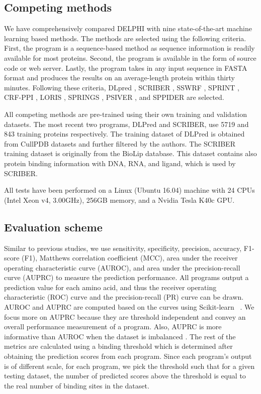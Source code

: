 \documentclass{bioinfo}
\begin{document}
\subsection{Competing methods}
We have comprehensively compared DELPHI with nine state-of-the-art machine learning based methods. The methods are selected using the following criteria. First, the program is a sequence-based method as sequence information is readily available for most proteins. Second, the program is available in the form of source code or web server. Lastly, the program takes in any input sequence in FASTA format and produces the results on an average-length protein within thirty minutes. Following these criteria, DLpred \citep{zhang2019sequence}, SCRIBER \citep{zhang2019scriber}, SSWRF \citep{wei2016protein}, SPRINT \citep{taherzadeh2016sequence}, CRF-PPI \citep{wei2015cascade}, LORIS \citep{dhole2014sequence}, SPRINGS \citep{singh2014springs}, PSIVER \citep{murakami2010applying}, and SPPIDER \citep{porollo2007prediction} are selected.

All competing methods are pre-trained using their own training and validation datasets. The most recent two programs, DLPred and SCRIBER, use 5719 and 843 training proteins respectively. The training dataset of DLPred is obtained from CullPDB datasets \citep{wang2003pisces} and further filtered by the authors. The SCRIBER training dataset is originally from the BioLip database. This dataset contains also protein binding information with DNA, RNA, and ligand, which is used by SCRIBER.

All tests have been performed on a Linux (Ubuntu 16.04) machine with 24 CPUs (Intel Xeon v4, 3.00GHz), 256GB memory, and a Nvidia Tesla K40c GPU.

\subsection{Evaluation scheme}
Similar to previous studies, we use sensitivity, specificity, precision, accuracy, F1-score (F1), Matthews correlation coefficient (MCC), area under the receiver operating characteristic curve (AUROC), and area under the precision-recall curve (AUPRC) to measure the prediction performance. All programs output a prediction value for each amino acid, and thus the receiver operating characteristic (ROC) curve and the precision-recall (PR) curve can be drawn. AUROC and AUPRC are computed based on the curves using Scikit-learn~ \citep{scikit-learn}. We focus more on AUPRC because they are threshold independent and convey an overall performance measurement of a program. Also, AUPRC is more informative than AUROC when the dataset is imbalanced \citep{saito2015precision}. The rest of the metrics are calculated using a binding threshold which is determined after obtaining the prediction scores from each program. Since each program's output is of different scale, for each program, we pick the threshold such that for a given testing dataset, the number of predicted scores above the threshold is equal to the real number of binding sites in the dataset. 
\end{document}
